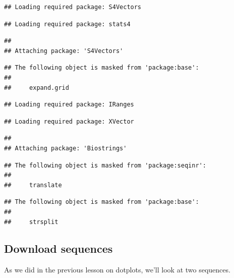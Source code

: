 \documentclass[
]{book}
\begin{document}
\begin{verbatim}
## Loading required package: S4Vectors
\end{verbatim}

\begin{verbatim}
## Loading required package: stats4
\end{verbatim}

\begin{verbatim}
## 
## Attaching package: 'S4Vectors'
\end{verbatim}

\begin{verbatim}
## The following object is masked from 'package:base':
## 
##     expand.grid
\end{verbatim}

\begin{verbatim}
## Loading required package: IRanges
\end{verbatim}

\begin{verbatim}
## Loading required package: XVector
\end{verbatim}

\begin{verbatim}
## 
## Attaching package: 'Biostrings'
\end{verbatim}

\begin{verbatim}
## The following object is masked from 'package:seqinr':
## 
##     translate
\end{verbatim}

\begin{verbatim}
## The following object is masked from 'package:base':
## 
##     strsplit
\end{verbatim}

\hypertarget{download-sequences-1}{%
\subsection{Download sequences}\label{download-sequences-1}}

As we did in the previous lesson on dotplots, we'll look at two sequences.
\end{document}
